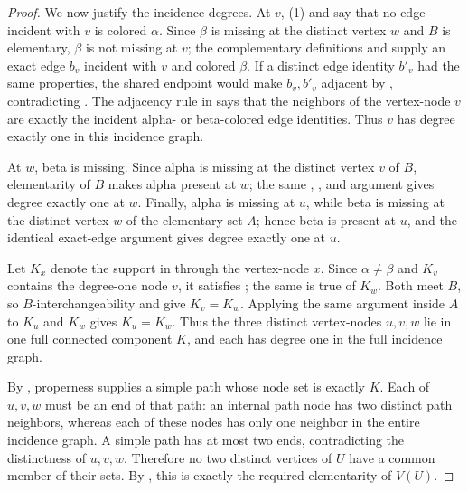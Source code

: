 \begin{proof}
We now justify the incidence degrees.  At $v$, (1) and
 say that no edge incident with $v$ is colored
$\alpha$.  Since $\beta$ is missing at the distinct vertex $w$ and $B$ is
elementary, $\beta$ is not missing at $v$; the complementary definitions
 and  supply an exact edge
$b_v$ incident with $v$ and colored $\beta$.  If a distinct edge identity
$b'_v$ had the same properties, the shared endpoint would make
$b_v,b'_v$ adjacent by , contradicting
.  The adjacency rule in
 says that the neighbors of the vertex-node
$v$ are exactly the incident alpha- or beta-colored edge identities.
Thus $v$ has degree exactly one in this incidence graph.

At $w$, beta is missing.  Since alpha is missing at the distinct vertex
$v$ of $B$, elementarity of $B$ makes alpha present at $w$; the same
, , and
 argument gives degree exactly one at
$w$.  Finally, alpha is missing at $u$, while beta is missing at the
distinct vertex $w$ of the elementary set $A$; hence beta is present at
$u$, and the identical exact-edge argument gives degree exactly one at
$u$.

Let $K_x$ denote the support in  through the
vertex-node $x$.  Since $\alpha\ne\beta$ and $K_v$ contains the degree-one
node $v$, it satisfies ; the same is true
of $K_w$.  Both meet $B$, so $B$-interchangeability and
 give $K_v=K_w$.  Applying the same argument
inside $A$ to $K_u$ and $K_w$ gives $K_u=K_w$.  Thus the three distinct
vertex-nodes $u,v,w$ lie in one full connected component $K$, and each has
degree one in the full incidence graph.

By , properness supplies a simple
path whose node set is exactly $K$.  Each of $u,v,w$ must be an end of
that path: an internal path node has two distinct path neighbors, whereas
each of these nodes has only one neighbor in the entire incidence graph.
A simple path has at most two ends, contradicting the distinctness of
$u,v,w$.  Therefore no two distinct vertices of $U$ have a common member
of their  sets.  By
, this is exactly the required
elementarity of $V(U)$.
\end{proof}
